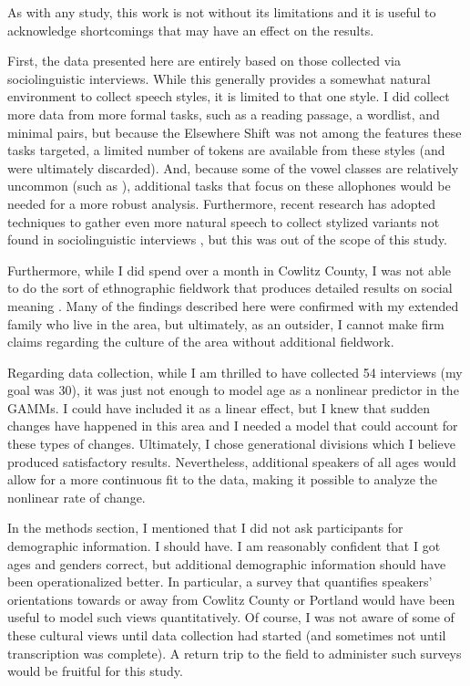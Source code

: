As with any study, this work is not without its limitations and it is useful to acknowledge shortcomings that may have an effect on the results.

First, the data presented here are entirely based on those collected via sociolinguistic interviews. While this generally provides a somewhat natural environment to collect speech styles, it is limited to that one style. I did collect more data from more formal tasks, such as a reading passage, a wordlist, and minimal pairs, but because the Elsewhere Shift was not among the features these tasks targeted, a limited number of tokens are available from these styles (and were ultimately discarded). And, because some of the vowel classes are relatively uncommon (such as \beng), additional tasks that focus on these allophones would be needed for a more robust analysis. Furthermore, recent research has adopted techniques to gather even more natural speech to collect stylized variants not found in sociolinguistic interviews \citep{vanhofwegen_2017_diss}, but this was out of the scope of this study.

Furthermore, while I did spend over a month in Cowlitz County, I was not able to do the sort of ethnographic fieldwork that produces detailed results on social meaning \citep{eckert_2000, hall_lew_2009_diss, pratt_2018_diss}. Many of the findings described here were confirmed with my extended family who live in the area, but ultimately, as an outsider, I cannot make firm claims regarding the culture of the area without additional fieldwork.

Regarding data collection, while I am thrilled to have collected 54 interviews (my goal was 30), it was just not enough to model age as a nonlinear predictor in the GAMMs. I could have included it as a linear effect, but I knew that sudden changes have happened in this area \citep{stanley_2018_pwpl} and I needed a model that could account for these types of changes. Ultimately, I chose generational divisions which I believe produced satisfactory results. Nevertheless, additional speakers of all ages would allow for a more continuous fit to the data, making it possible to analyze the nonlinear rate of change.

In the methods section, I mentioned that I did not ask participants for demographic information. I should have. I am reasonably confident that I got ages and genders correct, but additional demographic information should have been operationalized better. In particular, a survey that quantifies speakers' orientations towards or away from Cowlitz County or Portland would have been useful to model such views quantitatively. Of course, I was not aware of some of these cultural views until data collection had started (and sometimes not until transcription was complete). A return trip to the field to administer such surveys would be fruitful for this study.


